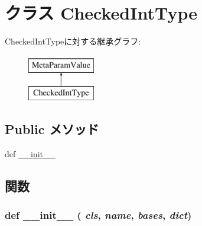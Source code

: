 \hypertarget{classm5_1_1params_1_1CheckedIntType}{
\section{クラス CheckedIntType}
\label{classm5_1_1params_1_1CheckedIntType}
}
CheckedIntTypeに対する継承グラフ:\begin{figure}[H]
\begin{center}
\leavevmode
\includegraphics[height=2cm]{classm5_1_1params_1_1CheckedIntType}
\end{center}
\end{figure}
\subsection*{Public メソッド}
\begin{DoxyCompactItemize}
\item 
def \hyperlink{classm5_1_1params_1_1CheckedIntType_ac775ee34451fdfa742b318538164070e}{\_\-\_\-init\_\-\_\-}
\end{DoxyCompactItemize}


\subsection{関数}
\hypertarget{classm5_1_1params_1_1CheckedIntType_ac775ee34451fdfa742b318538164070e}{
\subsubsection[{\_\-\_\-init\_\-\_\-}]{\setlength{\rightskip}{0pt plus 5cm}def \_\-\_\-init\_\-\_\- ( {\em cls}, \/   {\em name}, \/   {\em bases}, \/   {\em dict})}}
\label{classm5_1_1params_1_1CheckedIntType_ac775ee34451fdfa742b318538164070e}



